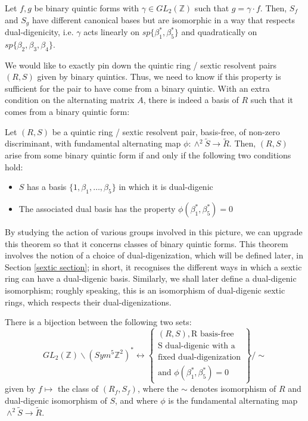 \documentclass{report}
\begin{document}
\begin{theorem}
Let $f,g$ be binary quintic forms with $\gamma \in GL_2(\mathbb{Z})$ such that $g = \gamma \cdot f$.  Then, $S_f$ and $S_g$ have different canonical bases but are isomorphic in a way that respects dual-digenicity, i.e. $\gamma$ acts linearly on $sp \{\beta_1^*, \beta_5^*\}$ and quadratically on $sp \{\beta_2,\beta_3,\beta_4\}$.
\end{theorem}

We would like to exactly pin down the quintic ring / sextic resolvent pairs $(R,S)$ given by binary quintics.  Thus, we need to know if this property is sufficient for the pair to have come from a binary quintic.  With an extra condition on the alternating matrix $A$, there is indeed a basis of $R$ such that it comes from a binary quintic form:
\begin{theorem}
Let $(R,S)$ be a quintic ring / sextic resolvent pair, basis-free, of non-zero discriminant, with fundamental alternating map $\phi : \wedge^2 \tilde{S} \to \tilde{R}$.  Then, $(R,S)$ arise from some binary quintic form if and only if the following two conditions hold:
\begin{itemize}
\item $S$ has a basis $\{1,\beta_1,\ldots,\beta_5\}$ in which it is dual-digenic
\item The associated dual basis has the property $\phi (\beta_1^*,\beta_5^*) = 0$
\end{itemize}
\end{theorem}

By studying the action of various groups involved in this picture, we can upgrade this theorem so that it concerns classes of binary quintic forms.  This theorem involves the notion of a choice of dual-digenization, which will be defined later, in Section \ref{sextic section}; in short, it recognises the different ways in which a sextic ring can have a dual-digenic basis.  Similarly, we shall later define a dual-digenic isomorphism; roughly speaking, this is an isomorphism of dual-digenic sextic rings, which respects their dual-digenizations.
\begin{theorem}
There is a bijection between the following two sets:
\begin{equation}
GL_2(\mathbb{Z}) \backslash 
(Sym^5 \mathbb{Z}^2)^* \leftrightarrow
\left\{
\begin{array}{l}
(R,S), \text{R basis-free} \\
\text{S dual-digenic with a} \\
\text{fixed dual-digenization} \\
\text{and } \phi (\beta_1^*,\beta_5^*) = 0 
\end{array}
\right\}
 / \sim
\end{equation}
given by $f \mapsto$ the class of $(R_f, S_f)$, where the $\sim$ denotes isomorphism of $R$ and dual-digenic isomorphism of $S$, and where $\phi$ is the fundamental alternating map $\wedge^2 \tilde{S} \to \tilde{R}$.
\end{theorem}
\end{document}
